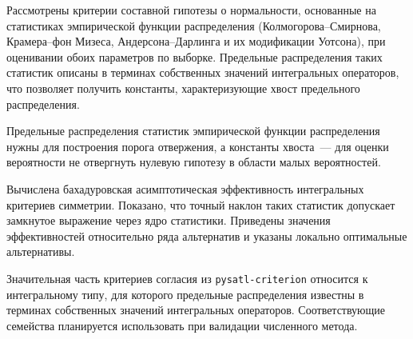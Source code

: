 
\review Рассмотрены критерии составной гипотезы о нормальности, основанные на статистиках
эмпирической функции распределения (Колмогорова--Смирнова, Крамера--фон Мизеса,
Андерсона--Дарлинга и их модификации Уотсона), при оценивании обоих параметров по выборке.
Предельные распределения таких статистик описаны в терминах собственных значений
интегральных операторов, что позволяет получить константы, характеризующие хвост
предельного распределения.

\why Предельные распределения статистик эмпирической функции распределения нужны для
построения порога отвержения, а константы хвоста~--- для оценки вероятности не отвергнуть
нулевую гипотезу в области малых вероятностей.


\review Вычислена бахадуровская асимптотическая эффективность интегральных критериев
симметрии. Показано, что точный наклон таких статистик допускает замкнутое выражение через
ядро статистики. Приведены значения эффективностей относительно ряда альтернатив и указаны
локально оптимальные альтернативы.

\why Значительная часть критериев согласия из \texttt{pysatl-criterion} относится к
интегральному типу, для которого предельные распределения известны в терминах собственных
значений интегральных операторов. Соответствующие семейства планируется использовать при
валидации численного метода.

